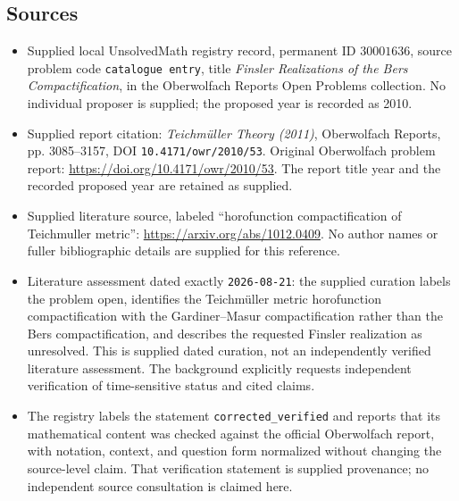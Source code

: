 \documentclass[11pt]{article}
\begin{document}
\subsection{Sources}
\begin{itemize}
\item Supplied local UnsolvedMath registry record, permanent ID \(30001636\), source problem code \texttt{catalogue entry}, title \emph{Finsler Realizations of the Bers Compactification}, in the Oberwolfach Reports Open Problems collection. No individual proposer is supplied; the proposed year is recorded as 2010.
\item Supplied report citation: \emph{Teichmüller Theory (2011)}, Oberwolfach Reports, pp. 3085--3157, DOI \texttt{10.4171/owr/2010/53}. Original Oberwolfach problem report: \url{https://doi.org/10.4171/owr/2010/53}. The report title year and the recorded proposed year are retained as supplied.
\item Supplied literature source, labeled ``horofunction compactification of Teichmuller metric'': \url{https://arxiv.org/abs/1012.0409}. No author names or fuller bibliographic details are supplied for this reference.
\item Literature assessment dated exactly \texttt{2026-08-21}: the supplied curation labels the problem open, identifies the Teichmüller metric horofunction compactification with the Gardiner--Masur compactification rather than the Bers compactification, and describes the requested Finsler realization as unresolved. This is supplied dated curation, not an independently verified literature assessment. The background explicitly requests independent verification of time-sensitive status and cited claims.
\item The registry labels the statement \texttt{corrected\_verified} and reports that its mathematical content was checked against the official Oberwolfach report, with notation, context, and question form normalized without changing the source-level claim. That verification statement is supplied provenance; no independent source consultation is claimed here.
\end{itemize}
\end{document}
